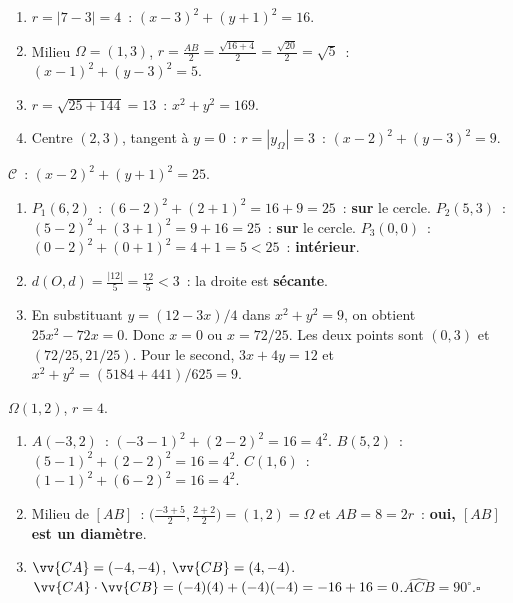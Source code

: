 
\begin{enumerate}
  \item $r=|7-3|=4$~: $(x-3)^2+(y+1)^2=16$.
  \item Milieu $\Omega=(1,3)$, $r=\frac{AB}{2}=\frac{\sqrt{16+4}}{2}=\frac{\sqrt{20}}{2}=\sqrt{5}$~:
        $(x-1)^2+(y-3)^2=5$.
  \item $r=\sqrt{25+144}=13$~: $x^2+y^2=169$.
  \item Centre $(2,3)$, tangent \`a $y=0$~: $r=|y_\Omega|=3$~: $(x-2)^2+(y-3)^2=9$.
\end{enumerate}


$\mathcal{C}$~: $(x-2)^2+(y+1)^2=25$.
\begin{enumerate}
  \item $P_1(6,2)$~: $(6-2)^2+(2+1)^2=16+9=25$~: \textbf{sur} le cercle.
        $P_2(5,3)$~: $(5-2)^2+(3+1)^2=9+16=25$~: \textbf{sur} le cercle.
        $P_3(0,0)$~: $(0-2)^2+(0+1)^2=4+1=5<25$~: \textbf{int\'erieur}.
  \item $d(O,d)=\frac{|12|}{5}=\frac{12}{5}<3$~: la droite est \textbf{s\'ecante}.
  \item En substituant $y=(12-3x)/4$ dans $x^2+y^2=9$, on obtient
        $25x^2-72x=0$. Donc $x=0$ ou $x=72/25$.
        Les deux points sont $(0,3)$ et $(72/25,21/25)$.
        Pour le second, $3x+4y=12$ et $x^2+y^2=(5184+441)/625=9$.
\end{enumerate}


$\Omega(1,2)$, $r=4$.
\begin{enumerate}
  \item $A(-3,2)$~: $(-3-1)^2+(2-2)^2=16=4^2$.\checkmark\quad
        $B(5,2)$~: $(5-1)^2+(2-2)^2=16=4^2$.\checkmark\quad
        $C(1,6)$~: $(1-1)^2+(6-2)^2=16=4^2$.\checkmark
  \item Milieu de $[AB]$~: $\bigl(\frac{-3+5}{2},\frac{2+2}{2}\bigr)=(1,2)=\Omega$
        et $AB=8=2r$~: \textbf{oui, $[AB]$ est un diam\`etre}.
  \item $\vv{CA}=(-4,-4)$, $\vv{CB}=(4,-4)$.
        $\vv{CA}\cdot\vv{CB}=(-4)(4)+(-4)(-4)=-16+16=0$.\checkmark\quad $\widehat{ACB}=90^{\circ}$.\hfill$\square$
\end{enumerate}

